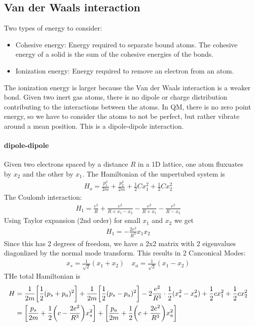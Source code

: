 \documentclass[../main.tex]{subfiles}
\begin{document}
\subsection*{Van der Waals interaction}

Two types of energy to consider:
\begin{itemize}
\item Cohesive energy: Energy required to separate bound atoms. The cohesive energy of a solid
is the sum of the cohesive energies of the bonds. 
\item Ionization energy: Energy required to remove an electron from an atom.
\end{itemize}

The ionization energy is larger because the Van der Waals interaction is a weaker bond. Given two
inert gas atoms, there is no dipole or charge distribution contributing to the interactions between
the atoms. In QM, there is no zero point energy, so we have to consider the atoms to not be perfect,
but rather vibrate around a mean position. This is a dipole-dipole interaction. 

\paragraph{dipole-dipole }Given two electrons spaced by a distance $R$ in a 1D lattice, one atom
fluxuates by $x_2$ and the other by $x_1$. The Hamiltonian of the unpertubed system is
\begin{align*}
    H_o = \frac{p_1^2}{2m} + \frac{p_2^2}{2m} + \frac{1}{2} C x_1^2 + \frac{1}{2} C x_2^2
\end{align*}
The Coulomb interaction:
\begin{align*}
    H_1 = \frac{e^2}{R} + \frac{e^2}{R + x_1 - x_2} - \frac{e^2}{R + x_1} - \frac{e^2}{R - x_2}
\end{align*}
Using Taylor expansion (2nd order) for small $x_1$ and $x_2$ we get
\begin{align*}
    H_1 = -\frac{2e^2}{R^3} x_1 x_2
\end{align*}
Since this has 2 degrees of freedom, we have a 2x2 matrix with 2 eigenvalues diagonlized by the
normal mode transform. This results in 2 Canconical Modes:
\begin{align*}
    x_s = \frac{1}{\sqrt{2}}(x_1 + x_2) \quad x_a = \frac{1}{\sqrt{2}}(x_1 - x_2)
\end{align*}
THe total Hamiltonian is
\begin{align*}
    H &= \frac{1}{2m} \qt[\frac{1}{2}(p_s + p_a)^2] + \frac{1}{2m}\qt[\frac{1}{2}(p_s - p_a)^2]
    - 2 \frac{e^2}{R^3} \cdot \frac{1}{2} (x_s^2 - x_a^2) + \frac{1}{2} cx_1^2 + \frac{1}{2} cx_2^2\\
    &= \qt[\frac{p_s}{2m} + \frac{1}{2} \qt(c - \frac{2e^2}{R^3})x_s^2] +
    \qt[\frac{p_a}{2m} + \frac{1}{2} \qt(c + \frac{2e^2}{R^3})x_a^2]
\end{align*}
\end{document}
